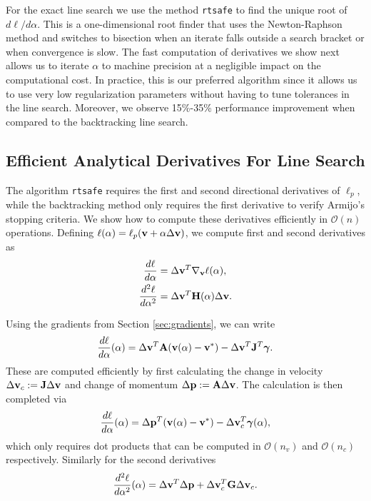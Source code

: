 For the exact line search we use the method \verb;rtsafe; \cite[\S
9.4]{bib:numerical_recipes} to find the unique root of $d\ell/d\alpha$. This is a one-dimensional
root finder that uses the Newton-Raphson method and switches to bisection
when an iterate falls outside a search bracket or
when convergence is slow. The fast computation of derivatives we show next
allows us to iterate $\alpha$ to machine precision at a negligible impact on the
computational cost. In practice, this is our preferred algorithm since it allows
us to use very low regularization parameters without having to tune tolerances
in the line search. Moreover, we observe 15\%-35\% performance improvement when
compared to the backtracking line search.

\subsection{Efficient Analytical Derivatives For Line Search}

The algorithm \verb;rtsafe; requires the first and second directional
derivatives of $\ell_p$, while the
backtracking method only requires the first derivative to verify Armijo's
stopping criteria. We show how to compute these derivatives efficiently in
$\mathcal{O}(n)$ operations. Defining $\ell(\alpha) =
\ell_p({\mathbf{v}}+\alpha\Delta{\mathbf{v}})$, we compute first and second derivatives as
\begin{align*}
	\frac{d\ell}{d\alpha}&=\Delta{\mathbf{v}}^T\nabla_{\mathbf{v}}\ell(\alpha),\\
	\frac{d^2\ell}{d\alpha^2}&=\Delta{\mathbf{v}}^T{\mathbf{H}}(\alpha)\Delta{\mathbf{v}}.
\end{align*}

Using the gradients from Section \ref{sec:gradients}, we can write
\begin{align*}
	\frac{d\ell}{d\alpha}(\alpha)=\Delta{\mathbf{v}}^T{\mathbf{A}}({\mathbf{v}}(\alpha)-{\mathbf{v}}^*)-\Delta{\mathbf{v}}^T{\mathbf{J}}^T{\bm\gamma}.
\end{align*}
These are computed efficiently by first calculating the change in velocity
$\Delta{\mathbf{v}}_c:={\mathbf{J}}\Delta{\mathbf{v}}$ and change of momentum $\Delta{\mathbf{p}} :=
{\mathbf{A}}\Delta{\mathbf{v}}$. The calculation is then completed via 
\begin{align*}
	\frac{d\ell}{d\alpha}(\alpha)=\Delta{\mathbf{p}}^T({\mathbf{v}}(\alpha)-{\mathbf{v}}^*)
	-\Delta{\mathbf{v}}_c^T{\bm\gamma}(\alpha),
\end{align*}
which only requires dot products that can be computed in $\mathcal{O}(n_v)$ and
$\mathcal{O}(n_c)$ respectively. Similarly for the second derivatives
\begin{align*}
	\frac{d^2\ell}{d\alpha^2}(\alpha)=\Delta{\mathbf{v}}^T\Delta{\mathbf{p}} + \Delta{\mathbf{v}}_c^T
	{\mathbf{G}}\Delta{\mathbf{v}}_c.
\end{align*}

